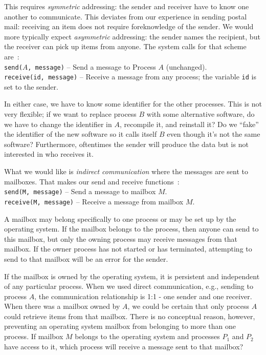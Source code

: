 This requires \textit{symmetric} addressing: the sender and receiver have to know one another to communicate. This deviates from our experience in sending postal mail: receiving an item does not require foreknowledge of the sender. We would more typically expect \textit{asymmetric} addressing: the sender names the recipient, but the receiver can pick up items from anyone. The system calls for that scheme are~\cite{osc}:\\
\texttt{send($A$, message)} -- Send a message to Process $A$ (unchanged).\\
\texttt{receive(id, message)} -- Receive a message from any process; the variable \texttt{id} is set to the sender.

In either case, we have to know some identifier for the other processes. This is not very flexible; if we want to replace process $B$ with some alternative software, do we have to change the identifier in $A$, recompile it, and reinstall it? Do we ``fake'' the identifier of the new software so it calls itself $B$ even though it's not the same software? Furthermore, oftentimes  the sender will produce the data but is not interested in who receives it. 

What we would like is \textit{indirect communication} where the messages are sent to mailboxes. That makes our send and receive functions~\cite{osc}:\\
\texttt{send(M, message)} -- Send a message to mailbox $M$.\\
\texttt{receive(M, message)} -- Receive a message from mailbox $M$.

A mailbox may belong specifically to one process or may be set up by the operating system. If the mailbox belongs to the process, then anyone can send to this mailbox, but only the owning process may receive messages from that mailbox. If the owner process has not started or has terminated, attempting to send to that mailbox will be an error for the sender.

If the mailbox is owned by the operating system, it is persistent and independent of any particular process. When we used direct communication, e.g., sending to process $A$, the communication relationship is 1:1 - one sender and one receiver. When there was a mailbox owned by $A$, we could be certain that only process $A$ could retrieve items from that mailbox. There is no conceptual reason, however, preventing an operating system mailbox from belonging to more than one process. If mailbox $M$ belongs to the operating system and processes $P_{1}$ and $P_{2}$ have access to it, which process will receive a message sent to that mailbox?

